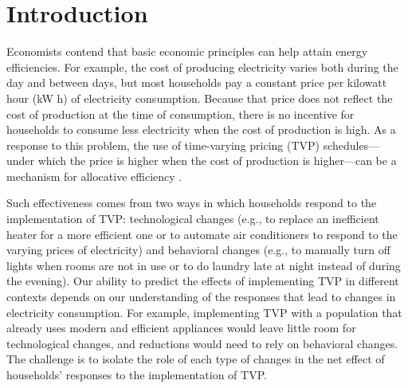 \documentclass[12pt]{article}
\begin{document}



%


\section{Introduction}

Economists contend that basic economic principles can help attain energy efficiencies. For example, the cost of producing electricity varies both during the day and between days, but most households pay a constant price per kilowatt hour (kW h) of electricity consumption. Because that price does not reflect the cost of production at the time of consumption, there is no incentive for households to consume less electricity when the cost of production is high. As a response to this problem, the use of time-varying pricing (TVP) schedules--- under which the price is higher when the cost of production is higher---can be a mechanism for allocative efficiency \citep{allcottRethinkingRealtimeElectricity2011,wolakResidentialCustomersRespond2011,jessoeUnderstandingRolePrice2014}.

Such effectiveness comes from two ways in which households respond to the implementation of TVP: technological changes (e.g., to replace an inefficient heater for a more efficient one or to automate air conditioners to respond to the varying prices of electricity) and behavioral changes (e.g., to manually turn off lights when rooms are not in use or to do laundry late at night instead of during the evening). Our ability to predict the effects of implementing TVP in different contexts depends on our understanding of the responses that lead to changes in electricity consumption. For example, implementing TVP with a population that already uses modern and efficient appliances would leave little room for technological changes, and reductions would need to rely on behavioral changes. The challenge is to isolate the role of each type of changes in the net effect of households’ responses to the implementation of TVP.
\end{document}
